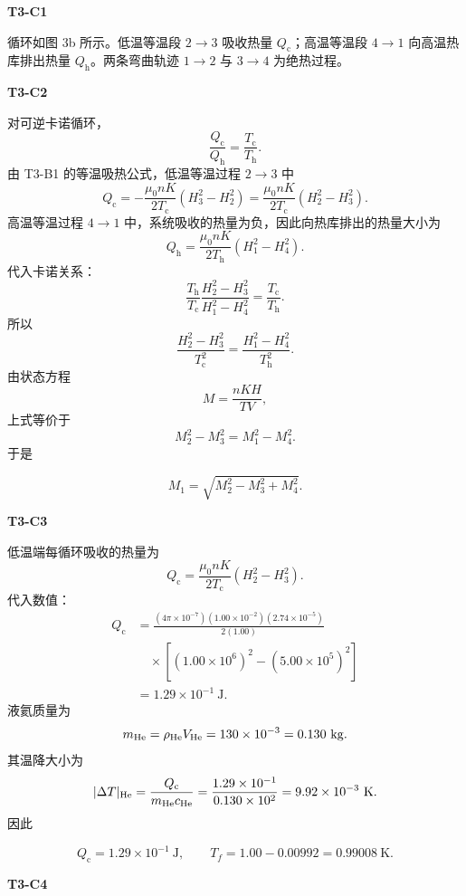 \documentclass[UTF8,11pt,a4paper,fontset=fandol]{ctexart}
\begin{document}
\begin{solutionbox}
\textbf{T3-C1}

循环如图 3b 所示。低温等温段 $2\to3$ 吸收热量 $Q_{\mathrm c}$；高温等温段 $4\to1$ 向高温热库排出热量 $Q_{\mathrm h}$。两条弯曲轨迹 $1\to2$ 与 $3\to4$ 为绝热过程。

\textbf{T3-C2}

对可逆卡诺循环，
\[
\frac{Q_{\mathrm c}}{Q_{\mathrm h}}=\frac{T_{\mathrm c}}{T_{\mathrm h}}.
\]
由 T3-B1 的等温吸热公式，低温等温过程 $2\to3$ 中
\[
Q_{\mathrm c}
=-\frac{\mu_0nK}{2T_{\mathrm c}}(H_3^2-H_2^2)
=\frac{\mu_0nK}{2T_{\mathrm c}}(H_2^2-H_3^2).
\]
高温等温过程 $4\to1$ 中，系统吸收的热量为负，因此向热库排出的热量大小为
\[
Q_{\mathrm h}
=\frac{\mu_0nK}{2T_{\mathrm h}}(H_1^2-H_4^2).
\]
代入卡诺关系：
\[
\frac{T_{\mathrm h}}{T_{\mathrm c}}
\frac{H_2^2-H_3^2}{H_1^2-H_4^2}
=\frac{T_{\mathrm c}}{T_{\mathrm h}}.
\]
所以
\[
\frac{H_2^2-H_3^2}{T_{\mathrm c}^2}
=\frac{H_1^2-H_4^2}{T_{\mathrm h}^2}.
\]
由状态方程
\[
M=\frac{nKH}{TV},
\]
上式等价于
\[
M_2^2-M_3^2=M_1^2-M_4^2.
\]
于是
\begin{answerbox}
\[
\boxed{M_1=\sqrt{M_2^2-M_3^2+M_4^2}}.
\]
\end{answerbox}

\textbf{T3-C3}

低温端每循环吸收的热量为
\[
Q_{\mathrm c}=\frac{\mu_0nK}{2T_{\mathrm c}}(H_2^2-H_3^2).
\]
代入数值：
\begin{align*}
Q_{\mathrm c}
&=\frac{(4\pi\times10^{-7})(1.00\times10^{-2})(2.74\times10^{-5})}{2(1.00)}\\
&\quad\times\left[(1.00\times10^6)^2-(5.00\times10^5)^2\right]\\
&=1.29\times10^{-1}\ \mathrm J.
\end{align*}
液氦质量为
\[
m_{\rm He}=\rho_{\rm He}V_{\rm He}
=130\times10^{-3}=0.130\ \mathrm{kg}.
\]
其温降大小为
\[
|\Delta T|_{\rm He}
=\frac{Q_{\mathrm c}}{m_{\rm He}c_{\rm He}}
=\frac{1.29\times10^{-1}}{0.130\times10^2}
=9.92\times10^{-3}\ \mathrm K.
\]
因此
\begin{answerbox}
\[
\boxed{Q_{\mathrm c}=1.29\times10^{-1}\ \mathrm J},
\qquad
\boxed{T_f=1.00-0.00992=0.99008\ \mathrm K}.
\]
\end{answerbox}

\textbf{T3-C4}


\end{solutionbox}
\end{document}
